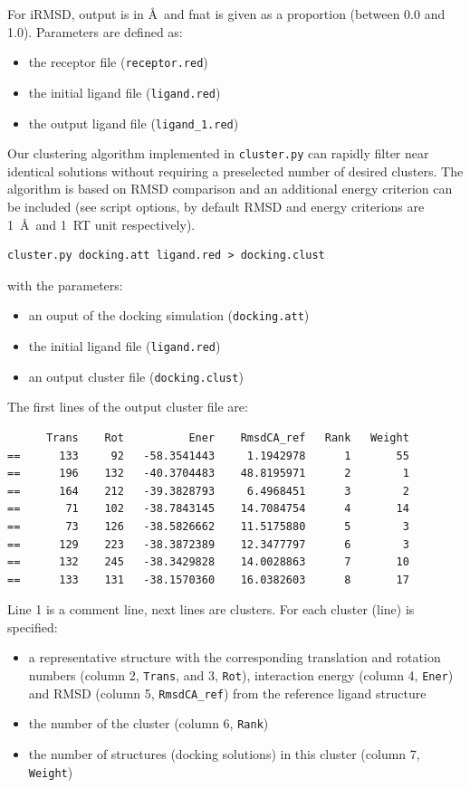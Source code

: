 \documentclass[12pt,a4paper]{article}
\begin{document}
For iRMSD, output is in \AA\ and fnat is given as a proportion (between 0.0 and 1.0). Parameters are defined as:
\begin{itemize}
\item the receptor file ({\tt receptor.red})
\item the initial ligand file ({\tt ligand.red})
\item the output ligand file ({\tt ligand\_1.red})
\end{itemize}

Our clustering algorithm implemented in {\tt cluster.py} can rapidly filter near identical solutions 
without requiring a preselected number of desired clusters.
The algorithm is based on RMSD comparison and an additional energy criterion can be included 
(see script options, by default RMSD and energy criterions are 1~\AA\ and 1~RT unit respectively).

\begin{verbatim}
cluster.py docking.att ligand.red > docking.clust
\end{verbatim}

with the parameters:
\begin{itemize}
\item an ouput of the docking simulation ({\tt docking.att})
\item the initial ligand file ({\tt ligand.red})
\item an output cluster file ({\tt docking.clust})
\end{itemize}

The first lines of the output cluster file are:

\linenumbers*
\begin{verbatim}
      Trans    Rot          Ener    RmsdCA_ref   Rank   Weight
==      133     92   -58.3541443     1.1942978      1       55
==      196    132   -40.3704483    48.8195971      2        1
==      164    212   -39.3828793     6.4968451      3        2
==       71    102   -38.7843145    14.7084754      4       14
==       73    126   -38.5826662    11.5175880      5        3
==      129    223   -38.3872389    12.3477797      6        3
==      132    245   -38.3429828    14.0028863      7       10
==      133    131   -38.1570360    16.0382603      8       17
\end{verbatim}
\nolinenumbers

Line 1 is a comment line, next lines are clusters. For each cluster (line)
is specified:
\begin{itemize}
\item a representative structure with the corresponding translation and rotation
numbers (column 2, {\tt Trans}, and 3, {\tt Rot}), interaction energy 
(column 4, {\tt Ener}) and RMSD (column 5, {\tt RmsdCA\_ref}) 
from the reference ligand structure
\item the number of the cluster (column 6, {\tt Rank})
\item the number of structures (docking solutions) in this cluster (column
7, {\tt Weight})
\end{itemize}
\end{document}
